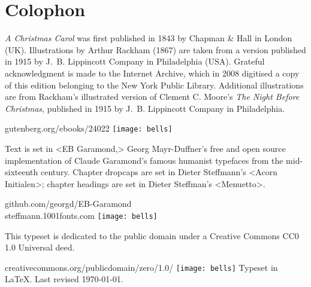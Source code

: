 \documentclass[
a5paper,
]{scrbook} %
\begin{document}

\renewcommand*{\chaptermarkformat}{}
\renewcommand*{\chapterheadendvskip}{\vspace{10pt}}
\renewcommand*{\chapterheadstartvskip}{\vspace{0pt}}



\mainmatter
\flushbottom
{}









\makeatletter
\let\scr@fnt@chapter\saved@chapterfont
\let\scr@fnt@chapterprefix\saved@chapterprefixfont
\makeatother

\cleardoublepage
{}
\chapter*{Colophon}
\vfill
\centering
\begin{minipage}{\textwidth}
\textit{A Christmas Carol} was first published in 1843 by Chapman \& Hall in London (UK). Illustrations by Arthur Rackham (1867) are taken from a version published in 1915 by J.~B. Lippincott Company in Philadelphia (USA). Grateful acknowledgment is made to the Internet Archive, which in 2008 digitised a copy of this edition belonging to the New York Public Library. Additional illustrations are from Rackham's illustrated version of Clement C. Moore's \textit{The Night Before Christmas}, published in 1915 by J.~B. Lippincott Company in Philadelphia.
\end{minipage}
\vfill
gutenberg.org/ebooks/24022
\vfill
\texttt{[image: bells]}
\vfill
\begin{minipage}{\textwidth}
Text is set in <EB Garamond,> Georg Mayr-Duffner's free and open source implementation of Claude Garamond’s famous humanist typefaces from the mid-sixteenth century. Chapter dropcaps are set in Dieter Steffmann's <Acorn Initialen>; chapter headings are set in Dieter Steffman's <Menuetto>.
\end{minipage}
\vfill
github.com/georgd/EB-Garamond
\\steffmann.1001fonts.com
\vfill
\texttt{[image: bells]}
\vfill
\begin{minipage}{\textwidth}
This typeset is dedicated to the public domain under a Creative Commons CC0 1.0 Universal deed.
\end{minipage}
\vfill
creativecommons.org/publicdomain/zero/1.0/
\vfill
\texttt{[image: bells]}
\vfill
Typeset in \LaTeX{}. Last revised \today.
\thispagestyle{empty}
\end{document}
